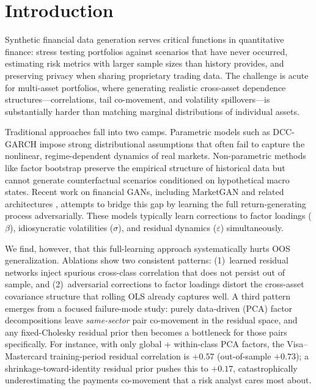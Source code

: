 \section{Introduction}

Synthetic financial data generation serves critical functions in quantitative finance: stress testing portfolios against scenarios that have never occurred, estimating risk metrics with larger sample sizes than history provides, and preserving privacy when sharing proprietary trading data.
The challenge is acute for multi-asset portfolios, where generating realistic cross-asset dependence structures---correlations, tail co-movement, and volatility spillovers---is substantially harder than matching marginal distributions of individual assets.

Traditional approaches fall into two camps.
Parametric models such as DCC-GARCH \citep{engle2002dynamic} impose strong distributional assumptions that often fail to capture the nonlinear, regime-dependent dynamics of real markets.
Non-parametric methods like factor bootstrap \citep{huh2026marketgans} preserve the empirical structure of historical data but cannot generate counterfactual scenarios conditioned on hypothetical macro states.
Recent work on financial GANs, including MarketGAN \citep{huh2026marketgans} and related architectures \citep{vuletic2023fingen, cont2025tailgan}, attempts to bridge this gap by learning the full return-generating process adversarially.
These models typically learn corrections to factor loadings ($\beta$), idiosyncratic volatilities ($\sigma$), and residual dynamics ($\varepsilon$) simultaneously.

We find, however, that this full-learning approach systematically hurts OOS generalization.
Ablations show two consistent patterns:
(1)~learned residual networks inject spurious cross-class correlation that does not persist out of sample, and
(2)~adversarial corrections to factor loadings distort the cross-asset covariance structure that rolling OLS already captures well.
A third pattern emerges from a focused failure-mode study: purely data-driven (PCA) factor decompositions leave \emph{same-sector} pair co-movement in the residual space, and any fixed-Cholesky residual prior then becomes a bottleneck for those pairs specifically. For instance, with only global + within-class PCA factors, the Visa--Mastercard training-period residual correlation is $+0.57$ (out-of-sample $+0.73$); a shrinkage-toward-identity residual prior pushes this to $+0.17$, catastrophically underestimating the payments co-movement that a risk analyst cares most about.

